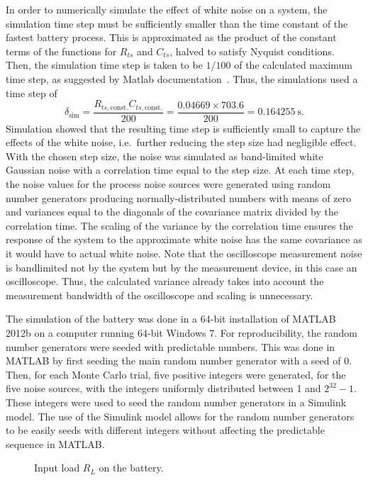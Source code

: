 \documentclass[../zhang_thesis.tex]{subfiles}
\begin{document}
In order to numerically simulate the effect of white noise on a system, the simulation time step must be sufficiently smaller than the time constant of the fastest battery process. This is approximated as the product of the constant terms of the functions for $R_{ts}$ and $C_{ts}$, halved to satisfy Nyquist conditions. Then, the simulation time step is taken to be $1/100$ of the calculated maximum time step, as suggested by Matlab documentation~\cite{matlab}. Thus, the simulations used a time step of
\begin{equation}
    \delta_\text{sim} = \frac{R_{ts,\text{const.}}C_{ts,\text{const.}}}{200} = \frac{0.04669\times 703.6}{200} = 0.164255~\text{s}.
\end{equation}
Simulation showed that the resulting time step is sufficiently small to capture the effects of the white noise, i.e.\ further reducing the step size had negligible effect. With the chosen step size, the noise was simulated as band-limited white Gaussian noise with a correlation time equal to the step size. At each time step, the noise values for the process noise sources were generated using random number generators producing normally-distributed numbers with means of zero and variances
equal to the diagonals of the covariance matrix divided by the correlation time. The scaling of the variance by the correlation time ensures the response of the system to the approximate white noise has the same covariance as it would have to actual white noise. Note that the oscilloscope measurement noise is bandlimited not by the system but by the measurement device, in this case an oscilloscope. Thus, the calculated variance already takes into account the measurement bandwidth of the oscilloscope and
scaling is unnecessary.

The simulation of the battery was done in a 64-bit installation of MATLAB 2012b on a computer running 64-bit Windows 7. For reproducibility, the random number generators were seeded with predictable numbers. This was done in MATLAB by first seeding the main random number generator with a seed of 0. Then, for each Monte Carlo trial, five positive integers were generated, for the five noise sources, with the integers uniformly distributed between 1 and $2^{32}-1$. These integers were used to
seed the random number generators in a Simulink model. The use of the Simulink model allows for the random number generators to be easily seeds with different integers without affecting the predictable sequence in MATLAB.

\begin{figure}[htb]
\centering
%
\caption{Input load $R_L$ on the battery.}
\label{fig:input}
\end{figure}
\end{document}
